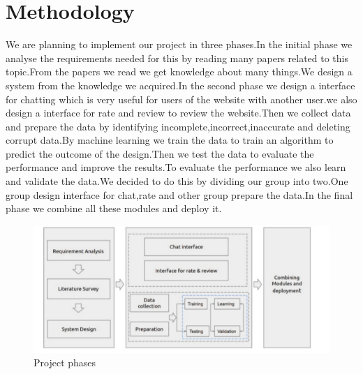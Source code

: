 \chapter{Methodology}
We are planning to implement our project in three phases.In the initial phase we analyse the requirements needed for this by reading many papers related to this topic.From the papers we read we get knowledge about many things.We design a system from the knowledge we acquired.In the second phase we design a interface for chatting which is very useful for users of the website with another user.we also design a interface for rate and review to review the website.Then we collect data and prepare the data by identifying incomplete,incorrect,inaccurate and deleting corrupt data.By machine learning we train the data to train an algorithm to predict the outcome of the design.Then we test the data to evaluate the performance and improve the results.To evaluate the performance we also learn and validate the data.We decided to do this by dividing our group into two.One group design interface for chat,rate and other group prepare the data.In the final phase we combine all these modules and deploy it.
\pagebreak


\begin{figure}
    \centering
    \includegraphics[scale=0.5]{images/project_phases.jpeg}
    \caption{Project phases}
    \label{fig:Methodology}
\end{figure}


